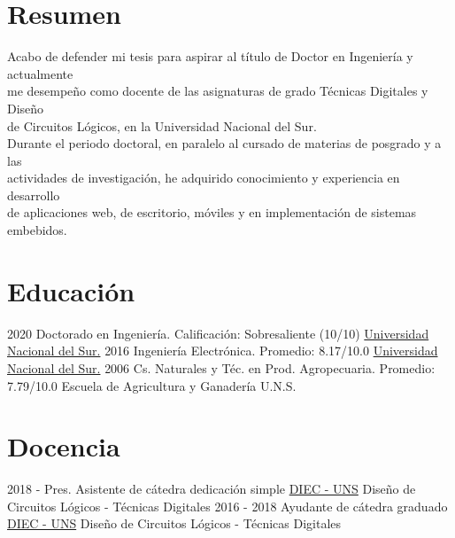 \documentclass[letterpaper]{twentysecondcv} %
\begin{document}
\makeprofilefirst %

\section{Resumen}
\begin{twenty}

Acabo de defender mi tesis para aspirar al título de Doctor en Ingeniería y actualmente \\
me desempeño como docente de las asignaturas de grado Técnicas Digitales y Diseño  \\
de Circuitos Lógicos, en la Universidad Nacional del Sur.\\

Durante el periodo doctoral, en paralelo al cursado de materias de posgrado y a las \\
actividades de investigación, he adquirido conocimiento y experiencia en desarrollo \\
de aplicaciones web, de escritorio, móviles y en implementación de sistemas \\
embebidos.

\end{twenty}

\section{Educación}
\begin{twenty}
    \twentyitem
        {2020}
        {}
        {Doctorado en Ingeniería.}
        {Calificación: Sobresaliente (10/10)}
        {\href{http://www.uns.edu.ar/}{Universidad Nacional del Sur.}}
        {}
    \twentyitem
        {2016}
        {}
        {Ingeniería Electrónica.}
        {Promedio: 8.17/10.0}
        {\href{http://www.uns.edu.ar/}{Universidad Nacional del Sur.}}
        {}
    \twentyitem
        {2006}
        {}
        {Cs. Naturales y Téc. en Prod. Agropecuaria.}
        {Promedio: 7.79/10.0}
        {Escuela de Agricultura y Ganadería U.N.S.}
        {}
\end{twenty}

\section{Docencia}
\begin{twenty}
    \twentyitem
        {2018 - Pres.}
        {}
        {Asistente de cátedra dedicación simple}
        {\href{http://www.diec.uns.edu.ar/}{DIEC - UNS}}
        {}
        {Diseño de Circuitos Lógicos - Técnicas Digitales}
    \twentyitem
        {2016 - 2018}
        {}
        {Ayudante de cátedra graduado}
        {\href{http://www.diec.uns.edu.ar/}{DIEC - UNS}}
        {}
        {Diseño de Circuitos Lógicos - Técnicas Digitales}
\end{twenty}
\end{document}
